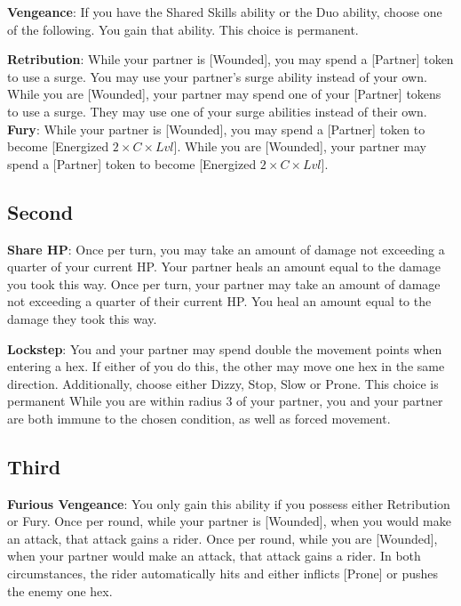 \begin{multicols*}{2}
\textbf{Vengeance}: If you have the Shared Skills ability or the Duo ability, choose one of the following. You gain that ability. This choice is permanent.
\begin{itemize}
\thing \textbf{Retribution}: While your partner is [Wounded], you may spend a [Partner] token to use a surge. You may use your partner's surge ability instead of your own. While you are [Wounded], your partner may spend one of your [Partner] tokens to use a surge. They may use one of your surge abilities instead of their own.
\thing \textbf{Fury}: While your partner is [Wounded], you may spend a [Partner] token to become [Energized $2\times C\times Lvl$]. While you are [Wounded], your partner may spend a [Partner] token to become [Energized $2\times C\times Lvl$].
\end{itemize} 
\subsection*{Second \Facet\perk}
\textbf{Share HP}: Once per turn, you may take an amount of damage not exceeding a quarter of your current HP. Your partner heals an amount equal to the damage you took this way. Once per turn, your partner may take an amount of damage not exceeding a quarter of their current HP. You heal an amount equal to the damage they took this way.

\textbf{Lockstep}: You and your partner may spend double the movement points when entering a hex. If either of you do this, the other may move one hex in the same direction. Additionally, choose either Dizzy, Stop, Slow or Prone. This choice is permanent While you are within radius 3 of your partner, you and your partner are both immune to the chosen condition, as well as forced movement.

\subsection*{Third \Facet\perk}
\textbf{Furious Vengeance}: You only gain this ability if you possess either Retribution or Fury. Once per round, while your partner is [Wounded], when you would make an attack, that attack gains a rider. Once per round, while you are [Wounded], when your partner would make an attack, that attack gains a rider. In both circumstances, the rider automatically hits and either inflicts [Prone] or pushes the enemy one hex.


\end{multicols*}
